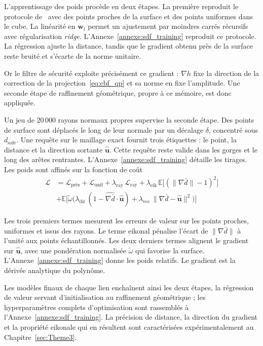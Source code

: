 L'apprentissage des poids procède en deux étapes. La première reproduit le protocole de~\cite{Li2024rdf} avec des points proches de la surface et des points uniformes dans le cube. La linéarité en $\mathbf{w}_l$ permet un ajustement par moindres carrés récursifs avec régularisation \textit{ridge}. L'Annexe~\ref{annexe:sdf_training} reproduit ce protocole. La régression ajuste la distance, tandis que le gradient obtenu près de la surface reste bruité et s'écarte de la norme unitaire.

Or le filtre de sécurité exploite précisément ce gradient : $\nabla h$ fixe la direction de la correction de la projection~\eqref{eq:cbf_qp} et sa norme en fixe l'amplitude. Une seconde étape de raffinement géométrique, propre à ce mémoire, est donc appliquée.

Un jeu de $20\,000$ rayons normaux propres supervise la seconde étape. Des points de surface sont déplacés le long de leur normale par un décalage $\delta$, concentré sous $d_{\mathrm{safe}}$. Une requête sur le maillage exact fournit trois étiquettes : le point, la distance et la direction sortante $\hat{\mathbf{u}}$. Cette requête reste valide dans les gorges et le long des arêtes rentrantes. L'Annexe~\ref{annexe:sdf_training} détaille les tirages. Les poids sont affinés sur la fonction de coût
\begin{equation}\label{eq:loss_refinement}
  \begin{split}
    \mathcal{L} &= \mathcal{L}_{\text{près}} + \mathcal{L}_{\mathrm{unif}} + \lambda_{\mathrm{ray}}\,\mathcal{L}_{\mathrm{ray}}
    + \lambda_{\mathrm{eik}}\,\mathbb{E}\big[(\|\nabla\bar{d}\|-1)^2\big] \\
    &+ \mathbb{E}\Big[\tilde{\omega}\big(\lambda_{\mathrm{dir}}\,(1-\widehat{\nabla \bar{d}}\cdot\hat{\mathbf{u}})
    + \lambda_{\mathrm{vec}}\,\|\nabla\bar{d}-\hat{\mathbf{u}}\|^2\big)\Big]
  \end{split}
\end{equation}

Les trois premiers termes mesurent les erreurs de valeur sur les points proches, uniformes et issus des rayons. Le terme eikonal pénalise l'écart de $\|\nabla\bar{d}\|$ à l'unité aux points échantillonnés. Les deux derniers termes alignent le gradient sur $\hat{\mathbf{u}}$, avec une pondération normalisée $\tilde{\omega}$ qui favorise la surface. L'Annexe~\ref{annexe:sdf_training} donne les poids relatifs. Le gradient est la dérivée analytique du polynôme.

Les modèles finaux de chaque lien enchaînent ainsi les deux étapes, la régression de valeur servant d'initialisation au raffinement géométrique ; les hyperparamètres complets d'optimisation sont rassemblés à l'Annexe~\ref{annexe:sdf_training}. La précision de distance, la direction du gradient et la propriété eikonale qui en résultent sont caractérisées expérimentalement au Chapitre~\ref{sec:Theme3}.

